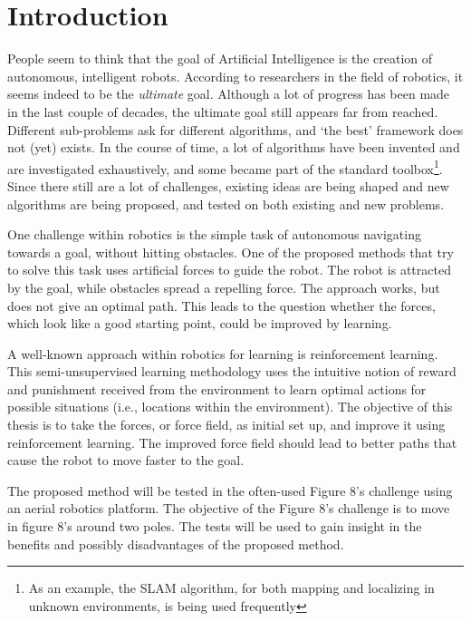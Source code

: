 \documentclass[11pt]{article}
\begin{document}
\pagestyle{empty} %
\tableofcontents
\pagebreak



\setcounter{page}{2}
\section{Introduction}
\label{sec:intro}


People seem to think that the goal of Artificial Intelligence is the creation of autonomous, intelligent robots. According to researchers in the field of robotics, it seems indeed to be the \emph{ultimate} goal. Although a lot of progress has been made in the last couple of decades, the ultimate goal still appears far from reached. Different sub-problems ask for different algorithms, and `the best' framework does not (yet) exists. In the course of time, a lot of algorithms have been invented and are investigated exhaustively, and some became part of the standard toolbox\footnote{As an example, the SLAM algorithm, for both mapping and localizing in unknown environments, is being used frequently}. Since there still are a lot of challenges, existing ideas are being shaped and new algorithms are being proposed, and tested on both existing and new problems.

One challenge within robotics is the simple task of autonomous navigating towards a goal, without hitting obstacles. One of the proposed methods that try to solve this task uses artificial forces to guide the robot. The robot is attracted by the goal, while obstacles spread a repelling force. The approach works, but does not give an optimal path. This leads to the question whether the forces, which look like a good starting point, could be improved by learning.

A well-known approach within robotics for learning is reinforcement learning. This semi-unsupervised learning methodology uses the intuitive notion of reward and punishment received from the environment to learn optimal actions for possible situations (i.e., locations within the environment). The objective of this thesis is to take the forces, or force field, as initial set up, and improve it using reinforcement learning. The improved force field should lead to better paths that cause the robot to move faster to the goal.

The proposed method will be tested in the often-used Figure 8's challenge using an aerial robotics platform. The objective of the Figure 8's challenge is to move in figure 8's around two poles. The tests will be used to gain insight in the benefits and possibly disadvantages of the proposed method.
\end{document}
